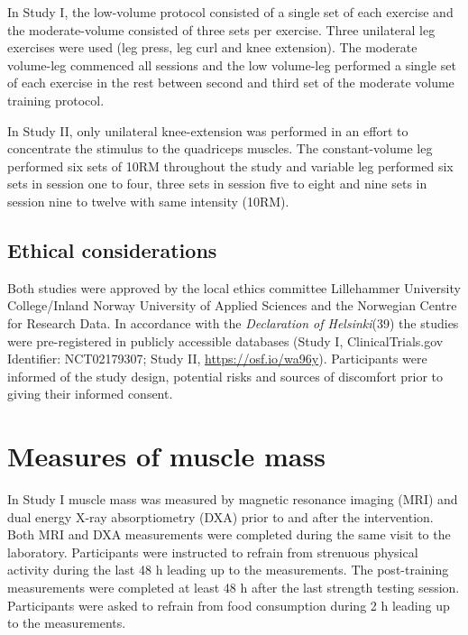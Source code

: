 \documentclass[twoside,10pt]{gihclass} %
\begin{document}
In Study I, the low-volume protocol consisted of a single set of each exercise and the moderate-volume consisted of three sets per exercise. Three unilateral leg exercises were used (leg press, leg curl and knee extension). The moderate volume-leg commenced all sessions and the low volume-leg performed a single set of each exercise in the rest between second and third set of the moderate volume training protocol.

In Study II, only unilateral knee-extension was performed in an effort to concentrate the stimulus to the quadriceps muscles. The constant-volume leg performed six sets of 10RM throughout the study and variable leg performed six sets in session one to four, three sets in session five to eight and nine sets in session nine to twelve with same intensity (10RM).

\hypertarget{ethical-considerations}{%
\subsection{Ethical considerations}\label{ethical-considerations}}

Both studies were approved by the local ethics committee Lillehammer University College/Inland Norway University of Applied Sciences and the Norwegian Centre for Research Data. In accordance with the \emph{Declaration of Helsinki}(39) the studies were pre-registered in publicly accessible databases (Study I, ClinicalTrials.gov Identifier: NCT02179307; Study II, \url{https://osf.io/wa96y}). Participants were informed of the study design, potential risks and sources of discomfort prior to giving their informed consent.

\hypertarget{measures-of-muscle-mass}{%
\section{Measures of muscle mass}\label{measures-of-muscle-mass}}

In Study I muscle mass was measured by magnetic resonance imaging (MRI) and dual energy X-ray absorptiometry (DXA) prior to and after the intervention. Both MRI and DXA measurements were completed during the same visit to the laboratory. Participants were instructed to refrain from strenuous physical activity during the last 48 h leading up to the measurements. The post-training measurements were completed at least 48 h after the last strength testing session. Participants were asked to refrain from food consumption during 2 h leading up to the measurements.
\end{document}
